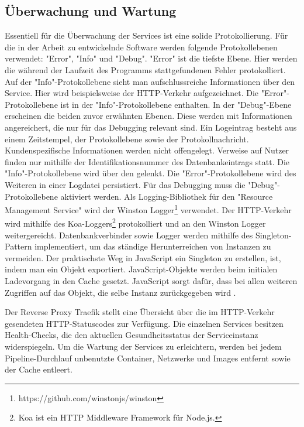 \subsection{Überwachung und Wartung}
\label{subsec:ueberwachungundwartung}
Essentiell für die Überwachung der Services ist eine solide Protokollierung.
Für die in der Arbeit zu entwickelnde Software werden folgende
Protokollebenen verwendet: "Error", "Info" und "Debug".
"Error" ist die tiefste Ebene. Hier werden die während der Laufzeit des Programms
stattgefundenen Fehler protokolliert. Auf der "Info"-Protokollebene sieht man
aufschlussreiche Informationen über den Service. Hier wird beispielsweise
der HTTP-Verkehr aufgezeichnet. Die "Error"-Protokollebene ist in der "Info"-Protokollebene
enthalten. In der "Debug"-Ebene erscheinen die beiden zuvor erwähnten Ebenen. Diese
werden mit Informationen angereichert, die nur für das Debugging relevant sind.
Ein Logeintrag besteht aus einem Zeitstempel, der Protokollebene sowie der Protokollnachricht.
Kundenspezifische Informationen werden nicht offengelegt. Verweise auf Nutzer finden nur
mithilfe der Identifikationsnummer des Datenbankeintrags statt. Die "Info"-Protokollebene
wird über den  gelenkt. Die "Error"-Protokollebene wird des Weiteren in einer
Logdatei persistiert. Für das Debugging muss die "Debug"-Protokollebene aktiviert werden.
Als Logging-Bibliothek für den "Resource Management Service" wird der Winston
Logger\footnote{https://github.com/winstonjs/winston} verwendet. Der HTTP-Verkehr wird mithilfe des Koa-Loggers\footnote{Koa ist ein HTTP Middleware Framework für Node.js.} protokolliert und an den Winston
Logger weitergereicht. Datenbankverbinder sowie Logger werden mithilfe des Singleton-Pattern
implementiert, um das ständige Herunterreichen von Instanzen zu vermeiden. Der praktischste
Weg in JavaScript ein Singleton zu erstellen, ist, indem man ein Objekt exportiert. JavaScript-Objekte
werden beim initialen Ladevorgang in den Cache gesetzt. JavaScript sorgt dafür,
dass bei allen weiteren Zugriffen auf das Objekt, die selbe Instanz zurückgegeben wird \cite{NodeJsCaching}.

Der Reverse Proxy Traefik stellt eine Übersicht über die im HTTP-Verkehr gesendeten 
HTTP-Statuscodes zur Verfügung. Die einzelnen Services besitzen Health-Checks, die den aktuellen
Gesundheitsstatus der Serviceinstanz widerspiegeln. Um die Wartung der Services zu erleichtern,
werden bei jedem Pipeline-Durchlauf unbenutzte Container, Netzwerke und Images
entfernt sowie der Cache entleert.

